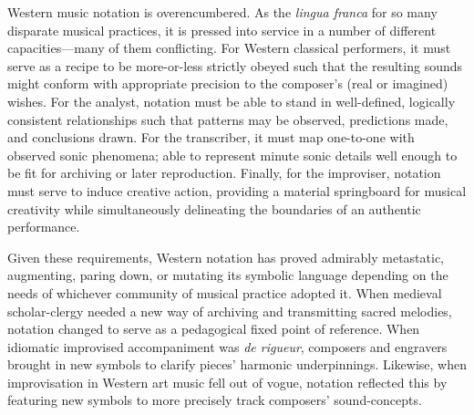 

Western music notation is overencumbered.
As the \textit{lingua franca} for so many disparate musical practices, it is pressed into service in a number of different capacities---many of them conflicting.
For Western classical performers, it must serve as a recipe to be more-or-less strictly obeyed such that the resulting sounds might conform with appropriate precision to the composer's (real or imagined) wishes.
For the analyst, notation must be able to stand in well-defined, logically consistent relationships such that patterns may be observed, predictions made, and conclusions drawn.
For the transcriber, it must map one-to-one with observed sonic phenomena; able to represent minute sonic details well enough to be fit for archiving or later reproduction.
Finally, for the improviser, notation must serve to induce creative action, providing a material springboard for musical creativity while simultaneously delineating the boundaries of an authentic performance.

Given these requirements, Western notation has proved admirably metastatic, augmenting, paring down, or mutating its symbolic language depending on the needs of whichever community of musical practice adopted it.
When medieval scholar-clergy needed a new way of archiving and transmitting sacred melodies, notation changed to serve as a pedagogical fixed point of reference.
When idiomatic improvised accompaniment was \textit{de rigueur}, composers and engravers brought in new symbols to clarify pieces' harmonic underpinnings. 
Likewise, when improvisation in Western art music fell out of vogue, notation reflected this by featuring new symbols to more precisely track composers' sound-concepts.

